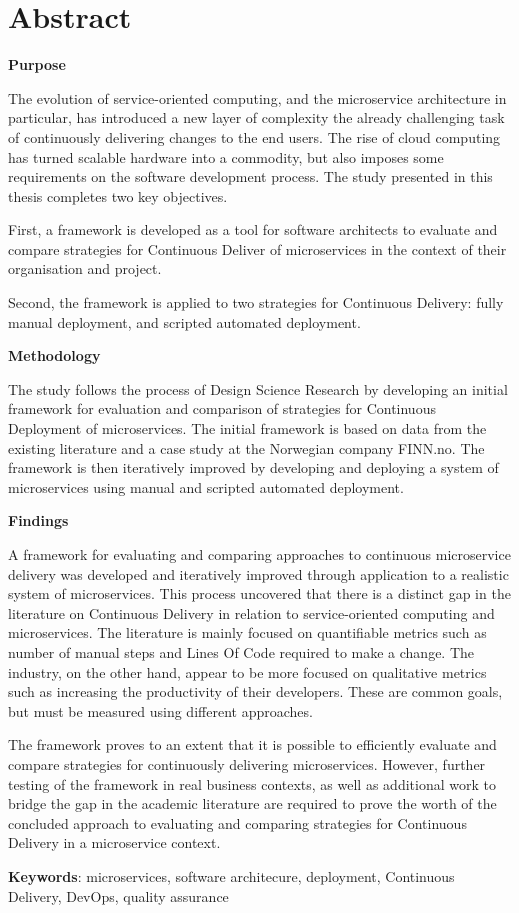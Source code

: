 \chapter*{Abstract}

\textbf{Purpose}

The evolution of service-oriented computing, and the microservice architecture in particular, has introduced a new layer of complexity the already challenging task of continuously delivering changes to the end users. The rise of cloud computing has turned scalable hardware into a commodity, but also imposes some requirements on the software development process. The study presented in this thesis completes two key objectives.

First, a framework is developed as a tool for software architects to evaluate and compare strategies for Continuous Deliver of microservices in the context of their organisation and project.

Second, the framework is applied to two strategies for Continuous Delivery: fully manual deployment, and scripted automated deployment.

\textbf{Methodology}

The study follows the process of Design Science Research by developing an initial framework for evaluation and comparison of strategies for Continuous Deployment of microservices. The initial framework is based on data from the existing literature and a case study at the Norwegian company FINN.no. The framework is then iteratively improved by developing and deploying a system of microservices using manual and scripted automated deployment. 

\textbf{Findings}

A framework for evaluating and comparing approaches to continuous microservice delivery was developed and iteratively improved through application to a realistic system of microservices. This process uncovered that there is a distinct gap in the literature on Continuous Delivery in relation to service-oriented computing and microservices. The literature is mainly focused on quantifiable metrics such as number of manual steps and Lines Of Code required to make a change. The industry, on the other hand, appear to be more focused on qualitative metrics such as increasing the productivity of their developers. These are common goals, but must be measured using different approaches.

The framework proves to an extent that it is possible to efficiently evaluate and compare strategies for continuously delivering microservices. However, further testing of the framework in real business contexts, as well as additional work to bridge the gap in the academic literature are required to prove the worth of the concluded approach to evaluating and comparing strategies for Continuous Delivery in a microservice context.

\textbf{Keywords}: microservices, software architecure, deployment, Continuous Delivery, DevOps, quality assurance
